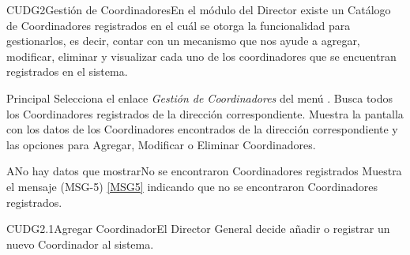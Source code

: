 
%  
	\begin{UseCase}{CUDG2}{Gestión de Coordinadores}{En el módulo del Director existe un Catálogo de Coordinadores registrados en el cuál se otorga la funcionalidad para gestionarlos, es decir, contar con un mecanismo que nos ayude a agregar, modificar, eliminar y visualizar cada uno de los coordinadores que se encuentran registrados en el sistema.}
	\end{UseCase}
	
		
	\begin{UCtrayectoria}{Principal}
		\UCpaso[\UCactor] Selecciona el enlace \textit{Gestión de Coordinadores} del menú .
		\UCpaso Busca todos los Coordinadores registrados de la dirección correspondiente. \label{paso:CUDG2BuscaCoords}
		\UCpaso Muestra la pantalla  con los datos de los Coordinadores encontrados de la dirección correspondiente y las opciones para Agregar, Modificar o Eliminar Coordinadores.  
	\end{UCtrayectoria}
	
	\begin{UCtrayectoriaA}{A}{No hay datos que mostrar}{No se encontraron Coordinadores registrados}
			\UCpaso Muestra el mensaje (MSG-5) \ref{MSG5} indicando que no se encontraron Coordinadores registrados.
	\end{UCtrayectoriaA}

	\begin{UseCase}{CUDG2.1}{Agregar Coordinador}{El Director General decide añadir o registrar un nuevo Coordinador al sistema.}
	\end{UseCase}
	
